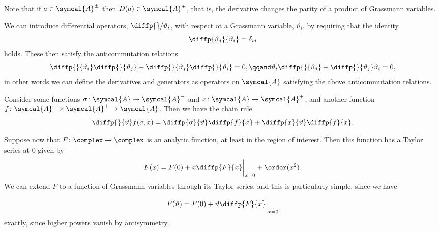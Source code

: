 Note that if \(a \in \symcal{A}^\pm\) then \(D(a) \in \symcal{A}^{\mp}\), that is, the derivative changes the parity of a product of Grassmann variables.

We can introduce differential operators, \(\diffp{}/{\vartheta_i}\), with respect ot a Grassmann variable, \(\vartheta_i\), by requiring that the identity
\begin{equation}
    \diffp{\vartheta_j}{\vartheta_i} = \delta_{ij}
\end{equation}
holds.
These then satisfy the anticommutation relations
\begin{equation}
    \diffp{}{\vartheta_i} \diffp{}{\vartheta_j} + \diffp{}{\vartheta_j}\diffp{}{\vartheta_i} = 0, \qqand \vartheta_i \diffp{}{\vartheta_j} + \diffp{}{\vartheta_j}\vartheta_i = 0,
\end{equation}
in other words we can define the derivatives and generators as operators on \(\symcal{A}\) satisfying the above anticommutation relations.

Consider some functions \(\sigma \colon \symcal{A} \to \symcal{A}^-\) and \(x \colon \symcal{A} \to \symcal{A}^+\), and another function \(f \colon \symcal{A}^- \times \symcal{A}^+ \to \symcal{A}\).
Then we have the chain rule
\begin{equation}
    \diffp{}{\vartheta} f(\sigma, x) = \diffp{\sigma}{\vartheta}\diffp{f}{\sigma} + \diffp{x}{\vartheta}\diffp{f}{x}.
\end{equation}

Suppose now that \(F \colon \complex \to \complex\) is an analytic function, at least in the region of interest.
Then this function has a Taylor series at \(0\) given by
\begin{equation}
    F(x) = F(0) + x\diffp{F}{x}\bigg|_{x=0} + \order(x^2).
\end{equation}
We can extend \(F\) to a function of Grassmann variables through its Taylor series, and this is particularly simple, since we have
\begin{equation}
    F(\vartheta) = F(0) + \vartheta\diffp{F}{x}\bigg|_{x=0}
\end{equation}
exactly, since higher powers vanish by antisymmetry.

